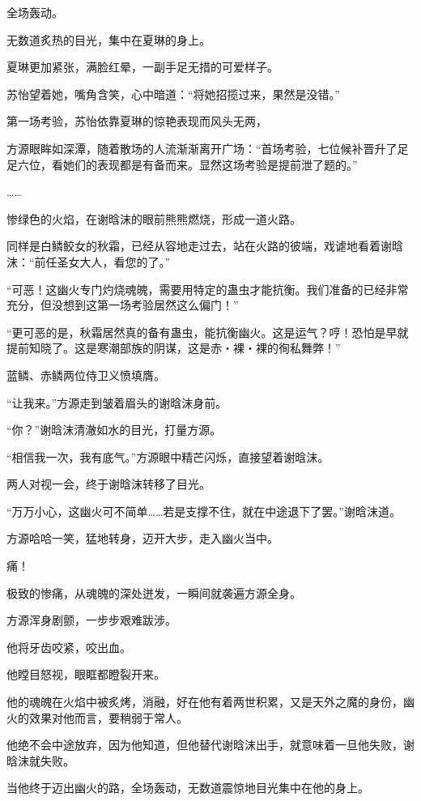 \begin{this_body}
全场轰动。

无数道炙热的目光，集中在夏琳的身上。

夏琳更加紧张，满脸红晕，一副手足无措的可爱样子。

苏怡望着她，嘴角含笑，心中暗道：“将她招揽过来，果然是没错。”

第一场考验，苏怡依靠夏琳的惊艳表现而风头无两，

方源眼眸如深潭，随着散场的人流渐渐离开广场：“首场考验，七位候补晋升了足足六位，看她们的表现都是有备而来。显然这场考验是提前泄了题的。”

……

惨绿色的火焰，在谢晗沫的眼前熊熊燃烧，形成一道火路。

同样是白鳞鲛女的秋霜，已经从容地走过去，站在火路的彼端，戏谑地看着谢晗沫：“前任圣女大人，看您的了。”

“可恶！这幽火专门灼烧魂魄，需要用特定的蛊虫才能抗衡。我们准备的已经非常充分，但没想到这第一场考验居然这么偏门！”

“更可恶的是，秋霜居然真的备有蛊虫，能抗衡幽火。这是运气？哼！恐怕是早就提前知晓了。这是寒潮部族的阴谋，这是赤・裸・裸的徇私舞弊！”

蓝鳞、赤鳞两位侍卫义愤填膺。

“让我来。”方源走到皱着眉头的谢晗沫身前。

“你？”谢晗沫清澈如水的目光，打量方源。

“相信我一次，我有底气。”方源眼中精芒闪烁，直接望着谢晗沫。

两人对视一会，终于谢晗沫转移了目光。

“万万小心，这幽火可不简单……若是支撑不住，就在中途退下了罢。”谢晗沫道。

方源哈哈一笑，猛地转身，迈开大步，走入幽火当中。

痛！

极致的惨痛，从魂魄的深处迸发，一瞬间就袭遍方源全身。

方源浑身剧颤，一步步艰难跋涉。

他将牙齿咬紧，咬出血。

他瞠目怒视，眼眶都瞪裂开来。

他的魂魄在火焰中被炙烤，消融，好在他有着两世积累，又是天外之魔的身份，幽火的效果对他而言，要稍弱于常人。

他绝不会中途放弃，因为他知道，但他替代谢晗沫出手，就意味着一旦他失败，谢晗沫就失败。

当他终于迈出幽火的路，全场轰动，无数道震惊地目光集中在他的身上。


\end{this_body}
